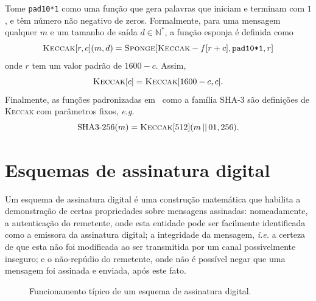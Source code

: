\documentclass{ufsctex/ufsctex}
\newcommand{\pk}{\mathcal{P}_k}
\newcommand{\sk}{\mathcal{S}_k}
\newcommand{\concat}{\, \vert{} \vert{} \,}
\newcommand{\binwds}[1]{\{0, 1\}^{#1}}
\begin{document}
Tome \texttt{pad10*1} como uma função que gera palavras que iniciam e terminam
com $1$, e têm número não negativo de zeros. Formalmente, para uma mensagem
qualquer $m$ e um tamanho de saída $d \in \mathbb{N}^{*}$, a função esponja é
definida como
\begin{equation}
  \textsc{Keccak}[r, c](m, d)
    = \textsc{Sponge}[\textsc{Keccak}-f[r + c], \texttt{pad10*1}, r]
\end{equation}
onde $r$ tem um valor padrão de $1600 - c$. Assim,
\begin{equation}
  \textsc{Keccak}[c] = \textsc{Keccak}[1600 - c, c].
\end{equation}
Finalmente, as funções padronizadas em~\cite{Dworkin:report:2015:jul} como a
família SHA-3 são definições de \textsc{Keccak} com parâmetros fixos,
\emph{e.g.}
\begin{equation}
  \text{SHA3-}256(m) = \textsc{Keccak}[512](m \concat 01, 256).
\end{equation}\simbolo{$\concat$}{Concatenação de palavras}

\section{Esquemas de assinatura digital}\label{section:digitalsig}

Um esquema de assinatura digital é uma construção matemática que habilita a
demonstração de certas propriedades sobre mensagens assinadas: nomeadamente, a
autenticação do remetente, onde esta entidade pode ser facilmente identificada
como a emissora da assinatura digital; a integridade da mensagem, \emph{i.e.} a
certeza de que esta não foi modificada ao ser transmitida por um canal
possivelmente inseguro; e o não-repúdio do remetente, onde não é possível negar
que uma mensagem foi assinada e enviada, após este fato.

\begin{figure}
  \centering
  \caption{Funcionamento típico de um
    esquema de assinatura digital.}\label{fig:2}
\end{figure}
\end{document}
